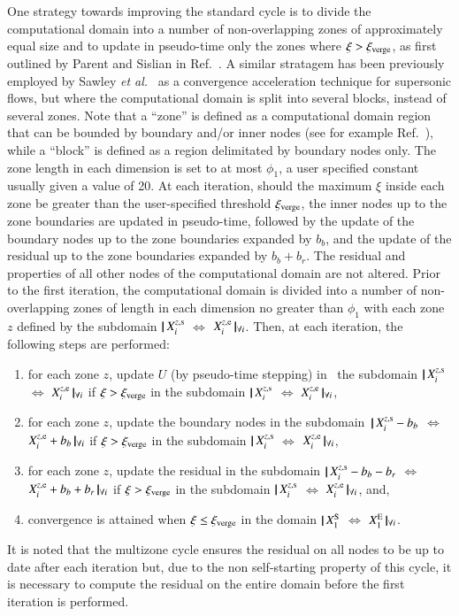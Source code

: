 \documentclass{warpdoc}
\newcommand{\bb}{{b_b}}
\newcommand{\br}{{b_r}}
\newcommand{\loope}{{\rm e}}
\newcommand{\loops}{{\rm s}}
\newcommand{\loopE}{{\rm E}}
\newcommand{\loopS}{{\rm S}}
\newcommand{\xiverge}{{\xi_{\rm verge}}}
\newcommand{\etal}{{\it et al.}~}
\newcommand\subdomain[3]{$ | \! | \, #2 $ $\Leftrightarrow$ $#3 \, | \! |_{#1}$}
\begin{document}
One strategy towards improving the standard cycle is to divide the computational
domain into a number of non-overlapping zones of approximately equal size
and to update in pseudo-time only the zones where $\xi>\xiverge$, as first outlined by Parent and Sislian in Ref.\ \cite{jcp:2002:parent}.
A similar stratagem has been previously employed
by Sawley \etal \cite{misc:1994:sawley}
as a convergence acceleration technique for supersonic flows, but where the
computational domain is split into several blocks, instead of several zones. 
Note that a ``zone'' is defined as a computational domain region that
can be bounded by boundary and/or inner nodes (see for example Ref.\
\cite{jcp:1994:rosenfeld}),
while a ``block'' is defined as a region delimitated  by boundary nodes only.
The zone length in each dimension is set to at most $\phi_1$, a user
specified constant usually given a value of 20.
At each iteration, should the maximum $\xi$ inside each zone be greater
than the user-specified threshold $\xiverge$, the inner nodes up to the
zone boundaries are updated in pseudo-time,
followed by the update of the boundary nodes up to the zone boundaries expanded by $\bb$,
and the update of the residual up to the zone boundaries expanded by $\bb+\br$.
The residual and properties of all other nodes of the computational domain
are not altered. Prior to the first iteration,
the computational domain is divided into a number of non-overlapping zones
of length in each dimension no greater than $\phi_1$ with
each zone $z$ defined by the subdomain \subdomain{\forall i}{X^{z,\loops}_i}{X^{z,\loope}_i}.
Then, at each iteration, the following steps are performed:
%
\begin{enumerate}
  \item{for each zone $z$, update $U$ (by pseudo-time stepping) in \
        the subdomain \subdomain{\forall i}{X^{z,\loops}_i}{X^{z,\loope}_i}
	if $\xi > \xiverge$ in the subdomain \subdomain{\forall i}{X^{z,\loops}_i}{X^{z,\loope}_i},}
  \item{for each zone $z$, update the boundary nodes in the subdomain\
        \subdomain{\forall i}{X^{z,\loops}_i-\bb}{X^{z,\loope}_i+\bb}
	if $\xi > \xiverge$ in the subdomain \subdomain{\forall i}{X^{z,\loops}_i}{X^{z,\loope}_i},}
  \item{for each zone $z$, update the residual in the subdomain
        \subdomain{\forall i}{X^{z,\loops}_i-\bb-\br}{X^{z,\loope}_i+\bb+\br}
	if $\xi > \xiverge$ in the subdomain \subdomain{\forall i}{X^{z,\loops}_i}{X^{z,\loope}_i}, and, }
  \item{convergence is attained when $\xi \leq \xiverge$ in the domain \subdomain{\forall i}{X^{\loopS}_1}{X^{\loopE}_1}.}
\end{enumerate}
%
It is noted that the multizone cycle ensures
the residual on all nodes to be up to date after each iteration but,
due to the non self-starting property of this cycle, it is
necessary to compute the residual on the entire domain before the first iteration
is performed.
\end{document}
